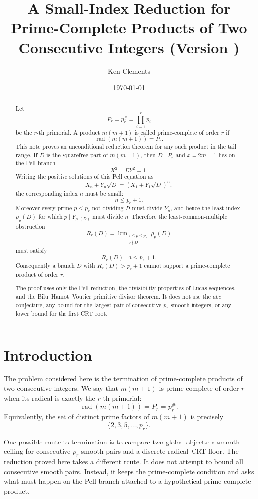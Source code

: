 \documentclass[11pt]{article}
\title{A Small-Index Reduction for Prime-Complete Products of Two Consecutive Integers (Version \docversion)}
\author{Ken Clements}
\date{\today}
\theoremstyle{definition}
\newcommand{\rad}{\operatorname{rad}}
\newcommand{\lcm}{\operatorname{lcm}}
\begin{document}
\maketitle

\begin{abstract}
Let
\[
        P_r=p_r^\#=\prod_{i=1}^r p_i
\]
be the $r$-th primorial.  A product $m(m+1)$ is called prime-complete of order $r$ if
\[
        \rad(m(m+1))=P_r.
\]
This note proves an unconditional reduction theorem for any such product in the tail range.  
If $D$ is the squarefree part of $m(m+1)$, then $D\mid P_r$ and $x=2m+1$ lies on the Pell branch
\[
        X^2-DY^2=1.
\]
Writing the positive solutions of this Pell equation as
\[
        X_n+Y_n\sqrt D=(X_1+Y_1\sqrt D)^n,
\]
the corresponding index $n$ must be small:
\[
        n \le p_r+1.
\]
Moreover every prime $p\le p_r$ not dividing $D$ must divide $Y_n$, and hence the least 
index $\rho_p(D)$ for which $p\mid Y_{\rho_p(D)}$ must divide $n$.  
Therefore the least-common-multiple obstruction
\[
        R_r(D)=\lcm_{\substack{3\le p\le p_r\\ p\nmid D}} \rho_p(D)
\]
must satisfy
\[
        R_r(D)\mid n\le p_r+1.
\]
Consequently a branch $D$ with $R_r(D)>p_r+1$ cannot support a prime-complete product of order $r$.

The proof uses only the Pell reduction, the divisibility properties of Lucas sequences, 
and the Bilu--Hanrot--Voutier primitive divisor theorem.  It does not use the $abc$ 
conjecture, any bound for the largest pair of consecutive $p_r$-smooth integers, 
or any lower bound for the first CRT root.
\end{abstract}

\section{Introduction}

The problem considered here is the termination of prime-complete products of two consecutive integers.  
We say that $m(m+1)$ is prime-complete of order $r$ when its radical is exactly the $r$-th primorial:
\[
        \rad(m(m+1))=P_r=p_r^\#.
\]
Equivalently, the set of distinct prime factors of $m(m+1)$ is precisely
\[
        \{2,3,5,\ldots,p_r\}.
\]

One possible route to termination is to compare two global objects: a smooth ceiling for 
consecutive $p_r$-smooth pairs and a discrete radical--CRT floor.  The reduction proved 
here takes a different route.  It does not attempt to bound all consecutive smooth pairs.  
Instead, it keeps the prime-complete condition and asks what must happen on the Pell 
branch attached to a hypothetical prime-complete product.
\end{document}
